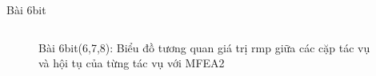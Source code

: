 \begin{frame}{Bài 6bit}
\begin{columns}
\begin{figure}[H]
                \caption{Bài 6bit(6,7,8): Biểu đồ tương quan giá trị rmp giữa các cặp tác vụ và hội tụ của từng tác vụ với MFEA2}
                \label{fig:my_label}
            \end{figure}
        \end{columns}
    \end{frame}

